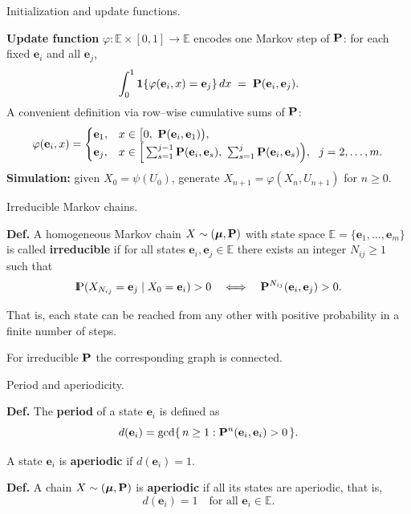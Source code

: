 \documentclass[aspectratio=169]{beamer}
\newcommand{\Prob}{{\rm I\hspace{-0.8mm}P}}
\newcommand{\e}[0]{\textbf{e}}
\newcommand{\E}[0]{\mathbb{E}}
\begin{document}
\begin{frame}{Initialization and update functions.}

\medskip
\textbf{Update function} \(\varphi:\E\times[0,1]\to\E\) encodes one Markov step of \(\mathbf{P}\):
for each fixed \(\e_i\) and all \(\e_j\),
\[
\int_0^1 \mathbf{1}\{\varphi(\e_i,x)=\e_j\}\,dx \;=\; \bfP(\e_i,\e_j).
\]
A convenient definition via row–wise cumulative sums of \(\mathbf{P}\):
\[
\varphi(\e_i,x)=
\begin{cases}
\e_1, & x\in\big[0,\ \bfP(\e_i,\e_1)\big),\\
\e_j, & x\in\Big[\sum_{s=1}^{j-1}\bfP(\e_i,\e_s),\ \sum_{s=1}^{j}\bfP(\e_i,\e_s)\Big),\ \ j=2,\ldots,m.
\end{cases}
\]
\pause
\medskip
\textbf{Simulation:} given \(X_0=\psi(U_0)\), generate \(X_{n+1}=\varphi(X_n,U_{n+1})\) for \(n\ge 0\).

\end{frame}

\begin{frame}{Irreducible Markov chains.}

\textbf{Def.}
A homogeneous Markov chain \(X\sim(\mbox{\boldmath $\mu$},\mathbf{P})\) with state space \(\E=\{\e_1,\ldots,\e_m\}\)
is called \textbf{irreducible} if for all states \(\e_i,\e_j\in\E\)
there exists an integer \(N_{ij}\ge1\) such that
\[
\Prob(X_{N_{ij}}=\e_j\mid X_0=\e_i)>0
\quad\Longleftrightarrow\quad
\bfP^{N_{ij}}(\e_i,\e_j)>0.
\]


That is, each state can be reached from any other with positive probability
in a finite number of steps.

\medskip
For irreducible \(\mathbf{P}\) the corresponding graph is   connected.
\end{frame}
\begin{frame}{Period and aperiodicity.}

\textbf{Def.}
The \textbf{period} of a state \(\e_i\) is defined as
\[
d(\e_i) = \gcd\{\, n\ge1 : \bfP^{n}(\e_i,\e_i)>0\,\}.
\]


A state \(\e_i\) is \textbf{aperiodic} if \(d(\e_i)=1\).

\pause
\medskip
\textbf{Def.}
A chain \(X\sim(\mbox{\boldmath $\mu$},\mathbf{P})\) is \textbf{aperiodic} if all its states are aperiodic,
that is,
\[
d(\e_i)=1\quad\text{for all } \e_i\in\E.
\]


\end{frame}
\end{document}
